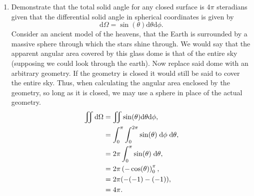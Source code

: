 \documentclass[a4paper, 12pt]{config/homework}
\begin{document}
\begin{enumerate}
\pagebreak
\item Demonstrate that the total solid angle for any closed surface is 4\(\pi \) steradians given that the differential solid angle in spherical coordinates is given by
\[\text{d}\Omega = \sin(\theta)\text{d}\theta\text{d}\phi.\]
Consider an ancient model of the heavens, that the Earth is surrounded by a massive sphere through which the stars shine through. We would say that the apparent angular area covered by this glass dome is that of the entire sky (supposing we could look through the earth). Now replace said dome with an arbitrary geometry. If the geometry is closed it would still be said to cover the entire sky. Thus, when calculating the angular area enclosed by the geometry, so long as it is closed, we may use a sphere in place of the actual geometry.
\begin{align*}
\iint{\text{d}\Omega} &= \iint{\sin(\theta)\text{d}\theta\text{d}\phi},\\
&= \bint{0}{\pi}{\bint{0}{2\pi}{\sin(\theta)}{\phi}}{\theta},\\
&= 2\pi \bint{0}{\pi}{\sin(\theta)}{\theta},\\
&= 2\pi \left(-\cos(\theta)\right)_0^\pi,\\
&= 2\pi(-(-1) - (-1)),\\
&= 4\pi.
\end{align*}


\end{enumerate}
\end{document}
